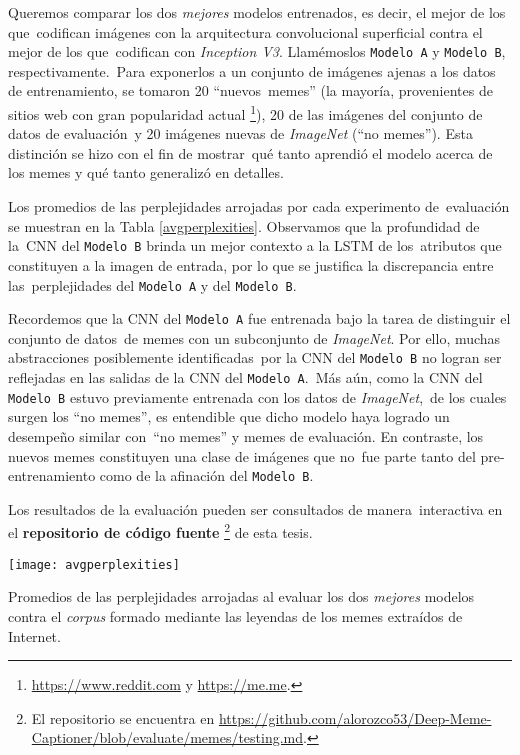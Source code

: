 Queremos comparar los dos \emph{mejores} modelos entrenados, es decir, el mejor de los que\
codifican imágenes con la arquitectura convolucional superficial contra el mejor de los que\
codifican con \emph{Inception V3}. Llamémoslos \verb+Modelo A+ y \verb+Modelo B+, respectivamente.\
Para exponerlos a un conjunto de imágenes ajenas a los datos de entrenamiento, se tomaron 20 ``nuevos\
memes'' (la mayoría, provenientes de sitios web con gran popularidad actual%
\footnote{
  \url{https://www.reddit.com} y \url{https://me.me}.
}), 20 de las imágenes del conjunto de datos de evaluación\
y 20 imágenes nuevas de \emph{ImageNet} (``no memes''). Esta distinción se hizo con el fin de mostrar\
qué tanto aprendió el modelo acerca de los memes y qué tanto generalizó en detalles.\par
Los promedios de las perplejidades arrojadas por cada experimento de\
evaluación se muestran en la Tabla \ref{avgperplexities}. Observamos que la profundidad de la\
CNN del \verb+Modelo B+ brinda un mejor contexto a la LSTM de los\
atributos que constituyen a la imagen de entrada, por lo que se justifica la discrepancia entre las\
perplejidades del \verb+Modelo A+ y del \verb+Modelo B+.\par
Recordemos que la CNN del \verb+Modelo A+ fue entrenada bajo la tarea de distinguir el conjunto de datos\
de memes con un subconjunto de \emph{ImageNet}. Por ello, muchas abstracciones posiblemente identificadas\
por la CNN del \verb+Modelo B+ no logran ser reflejadas en las salidas de la CNN del \verb+Modelo A+.\
Más aún, como la CNN del \verb+Modelo B+ estuvo previamente entrenada con los datos de \emph{ImageNet},\
de los cuales surgen los ``no memes'', es entendible que dicho modelo haya logrado un desempeño similar con\
``no memes'' y memes de evaluación. En contraste, los nuevos memes constituyen una clase de imágenes que no\
fue parte tanto del pre-entrenamiento como de la afinación del \verb+Modelo B+.\par
Los resultados de la evaluación pueden ser consultados de manera\
interactiva en el \textbf{repositorio de código fuente}%
\footnote{
  El repositorio se encuentra en \url{https://github.com/alorozco53/Deep-Meme-Captioner/blob/evaluate/memes/testing.md}.
} de esta tesis.

\begin{table}[H]
  \centering
  \texttt{[image: avgperplexities]}
  \caption{
    Promedios de las perplejidades arrojadas al evaluar los dos \emph{mejores} modelos contra el
    \emph{corpus} formado mediante las leyendas de los memes extraídos de Internet.
  }
  \label{avgperplexities}
\end{table}
